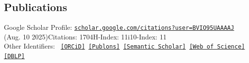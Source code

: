 \documentclass[10pt,margin,line,pifont,palatino,courier]{res}
\begin{document}
\begin{resume}
%






%


\section{\sc Publications}
    Google Scholar Profile:
    \href{https://scholar.google.com/citations?user=BVIO95UAAAAJ}{\small\texttt{scholar.google.com/citations?user=BVIO95UAAAAJ}}\\
    \hspace*{9.7em}(Aug. 10 2025)\quad Citations: 1704\quad H-Index: 11\quad i10-Index: 11\\
    Other Identifiers:
    {\footnotesize\tt
    \href{https://orcid.org/0000-0003-3813-4875}{[ORCiD]}
    \href{https://publons.com/researcher/4930582/mo-zhou}{[Publons]}
    \href{https://www.semanticscholar.org/author/Mo-Zhou/2109097390}{[Semantic Scholar]}
    \href{https://www.webofscience.com/wos/author/record/AAC-2403-2022}{[Web of Science]}
    \href{https://dblp.org/pid/24/4846}{[DBLP]}
    }


\end{resume}
\end{document}
